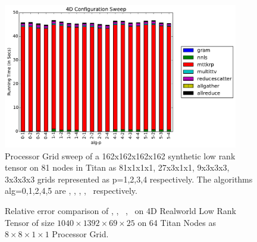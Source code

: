 \begin{figure}
\includegraphics[width=\textwidth, height=2.5in]{data/plots/confsweep4d.pdf}
\caption{Processor Grid sweep of a 162x162x162x162 synthetic low rank tensor on 81 nodes in Titan as 81x1x1x1, 27x3x1x1, 9x3x3x3, 3x3x3x3 grids represented as p=1,2,3,4 respectively. The algorithms alg=0,1,2,4,5 are \MU, \HALS, \BPP, \ADMM, \Nestrov\ respectively.}
\label{fig:confsweep4D}
\end{figure}

\begin{figure}
	\caption{Relative error comparison of \MU, \HALS, \BPP\, \ADMM, \Nestrov\ on 4D Realworld Low Rank Tensor of size $1040\times1392\times69\times25$ on 64 Titan Nodes as $8\times8\times1\times1$ Processor Grid.}
	\label{fig:convergencemouse}
\end{figure}

